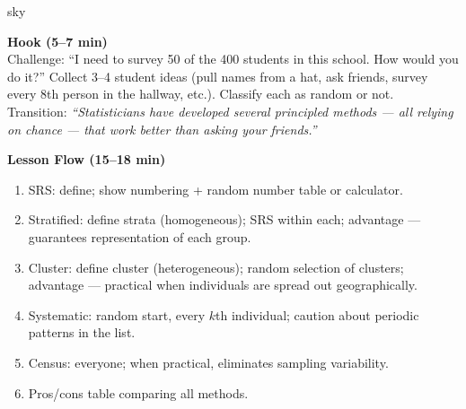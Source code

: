 \documentclass[10pt]{article}
\begin{document}
\begin{skillbox}{sky}
\begin{minipage}[t]{0.48\linewidth}
    \textbf{Hook (5--7 min)}\\
    Challenge: ``I need to survey 50 of the 400 students in this school. How would
    you do it?'' Collect 3--4 student ideas (pull names from a hat, ask friends,
    survey every 8th person in the hallway, etc.). Classify each as random or not.\\[4pt]
    Transition: \textit{``Statisticians have developed several principled methods --- all
    relying on chance --- that work better than asking your friends.''}
\end{minipage}
\hfill
\begin{minipage}[t]{0.48\linewidth}
    \textbf{Lesson Flow (15--18 min)}
    \begin{enumerate}
        \item SRS: define; show numbering + random number table or calculator.
        \item Stratified: define strata (homogeneous); SRS within each; advantage ---
              guarantees representation of each group.
        \item Cluster: define cluster (heterogeneous); random selection of clusters;
              advantage --- practical when individuals are spread out geographically.
        \item Systematic: random start, every $k$th individual; caution about periodic
              patterns in the list.
        \item Census: everyone; when practical, eliminates sampling variability.
        \item Pros/cons table comparing all methods.
    \end{enumerate}
\end{minipage}
\end{skillbox}
\end{document}
